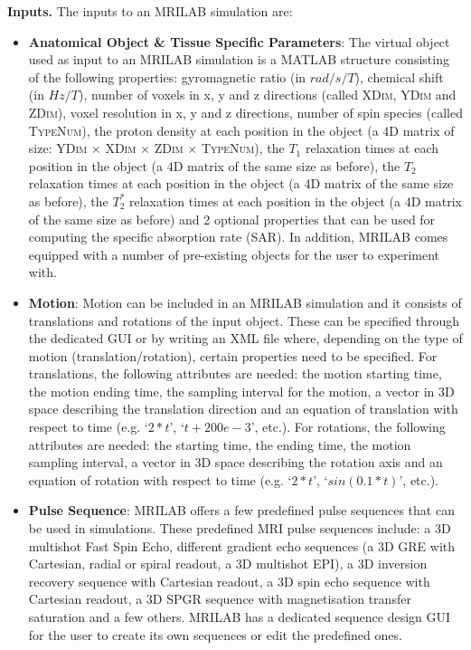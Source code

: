 \textbf{Inputs.} The inputs to an MRILAB simulation are:

\begin{itemize}
    
    \item \textbf{Anatomical Object \& Tissue Specific Parameters}: The virtual object used as input to an MRILAB simulation is a MATLAB structure consisting of the following properties:
    gyromagnetic ratio (in $rad/s/T$), 
    chemical shift (in $Hz/T$), 
    number of voxels in x, y and z directions (called \textsc{XDim}, \textsc{YDim} and \textsc{ZDim}),
    voxel resolution in x, y and z directions, 
    number of spin species (called \textsc{TypeNum}),
    the proton density at each position in the object (a 4D matrix of size: \textsc{YDim $\times$ XDim $\times$ ZDim $\times$ TypeNum}), 
    the $T_1$ relaxation times at each position in the object (a 4D matrix of the same size as before), 
    the $T_2$ relaxation times at each position in the object (a 4D matrix of the same size as before),
    the $T_2^*$ relaxation times at each position in the object (a 4D matrix of the same size as before) and 
    2 optional properties that can be used for computing the specific absorption rate (SAR).
    In addition, MRILAB comes equipped with a number of pre-existing objects for the user to experiment with.
    
    \item \textbf{Motion}: Motion can be included in an MRILAB simulation and it consists of translations and rotations of the input object.
    These can be specified through the dedicated GUI or by writing an XML file where, depending on the type of motion (translation/rotation), certain properties need to be specified. 
    For translations, the following attributes are needed:
    the motion starting time,
    the motion ending time,
    the sampling interval for the motion,
    a vector in 3D space describing the translation direction
    and an equation of translation with respect to time (e.g. `$2*t$', `$t+200e-3$', etc.).
    For rotations, the following attributes are needed:
    the starting time,
    the ending time,
    the motion sampling interval,
    a vector in 3D space describing the rotation axis and
    an equation of rotation with respect to time (e.g. `$2*t$', `$sin(0.1*t)$', etc.).
    
    \item \textbf{Pulse Sequence}: MRILAB offers a few predefined pulse sequences that can be used in simulations.
    These predefined MRI pulse sequences include: 
    a 3D multishot Fast Spin Echo,
    different gradient echo sequences (a 3D GRE with Cartesian, radial or spiral readout, a 3D multishot EPI),
    a 3D inversion recovery sequence with Cartesian readout, 
    a 3D spin echo sequence with Cartesian readout,
    a 3D SPGR sequence with magnetisation transfer saturation and a few others.
    MRILAB has a dedicated sequence design GUI for the user to create its own sequences or edit the predefined ones.
    

\end{itemize}
